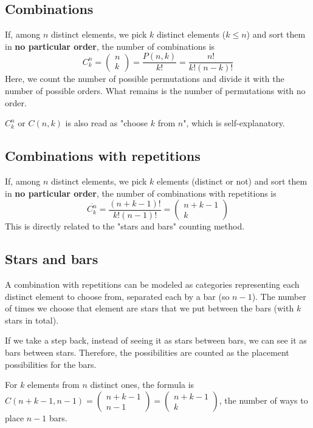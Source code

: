 \documentclass[10pt,a4paper]{book}
\begin{document}
\subsection{Combinations}
If, among $n$ distinct elements, we pick $k$ distinct elements ($k\leq n$) and sort them in \textbf{no particular order}, the number of combinations is
\[C^n_k = \begin{pmatrix}n\\k\end{pmatrix} = \frac{P(n,k)}{k!} = \frac{n!}{k!(n-k)!}\]
Here, we count the number of possible permutations and divide it with the number of possible orders. What remains is the number of permutations with no order.\par 
$C^n_k$ or $C(n,k)$ is also read as "choose $k$ from $n$", which is self-explanatory.
\subsection*{Combinations with repetitions}
If, among $n$ distinct elements, we pick $k$ elements (distinct or not) and sort them in \textbf{no particular order}, the number of combinations with repetitions is
\[\overline{C^n_k} = \frac{(n+k-1)!}{k!(n-1)!} = \begin{pmatrix}n+k-1\\k\end{pmatrix}\]
This is directly related to the "stars and bars" counting method.
\subsection{Stars and bars}
A combination with repetitions can be modeled as categories representing each distinct element to choose from, separated each by a bar (so $n-1$). The number of times we choose that element are stars that we put between the bars (with $k$ stars in total). \par
If we take a step back, instead of seeing it as stars between bars, we can see it as bars between stars. Therefore, the possibilities are counted as the placement possibilities for the bars.\par 
For $k$ elements from $n$ distinct ones, the formula is $C(n+k-1,n-1) = \begin{pmatrix}n+k-1\\n-1\end{pmatrix} = \begin{pmatrix}n+k-1\\k\end{pmatrix}$, the number of ways to place $n-1$ bars.
\end{document}
